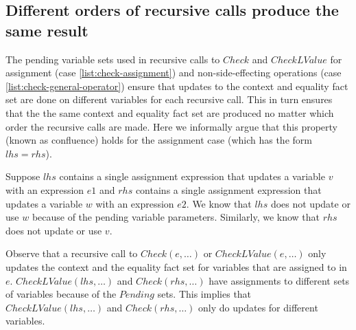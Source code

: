 \subsection{Different orders of recursive calls produce the same result}

The pending variable sets used in recursive calls to $Check$ and $CheckLValue$ for assignment (case
\ref{list:check-assignment}) and non-side-effecting operations
(case  \ref{list:check-general-operator})
ensure that updates to the context and equality fact set are done on different variables
for each recursive call.  This in turn ensures that the the same context and equality fact
set are produced no matter which order the recursive calls are made.   Here we informally argue 
that this property (known as confluence) holds for the assignment case (which has the form $lhs = rhs$).   

Suppose $lhs$
contains a single assignment expression that updates a variable $v$ with an expression $e1$ and 
$rhs$ contains a single assignment expression that updates  a variable $w$ with an expression $e2$.  
We know that $lhs$ does not update or use $w$ because of the pending variable parameters.  Similarly, 
we know that $rhs$ does not update or use $v$.

Observe that a recursive call to $Check(e, \ldots)$ or $CheckLValue(e, \ldots)$  only updates the context
and the equality fact set for variables that are assigned to in $e$.   $CheckLValue(lhs,\ldots)$ and
$Check(rhs, \ldots)$ have assignments to different sets of variables because of the $Pending$ sets.  This
implies that $CheckLValue(lhs,\ldots)$ and $Check(rhs, \ldots)$ only do updates for different variables.

